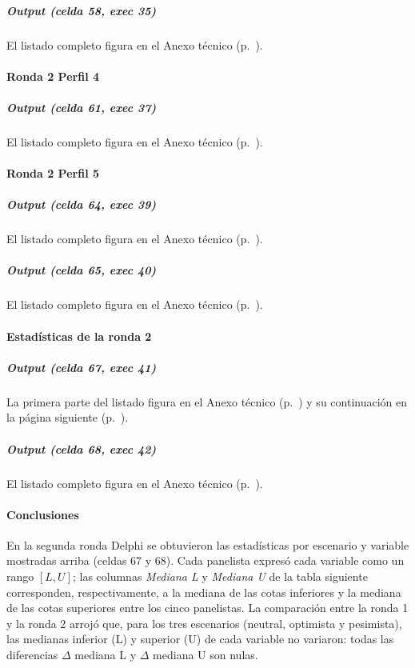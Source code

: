 \subparagraph{Output (celda 58, exec 35)}
El listado completo figura en el Anexo técnico (p.~\pageref{anexo:code-6-3-2-12}).


\paragraph{Ronda 2 Perfil 4}

\subparagraph{Output (celda 61, exec 37)}
El listado completo figura en el Anexo técnico (p.~\pageref{anexo:code-6-3-2-13}).


\paragraph{Ronda 2 Perfil 5}

\subparagraph{Output (celda 64, exec 39)}
El listado completo figura en el Anexo técnico (p.~\pageref{anexo:code-6-3-2-14}).

\subparagraph{Output (celda 65, exec 40)}
El listado completo figura en el Anexo técnico (p.~\pageref{anexo:code-6-3-2-15}).


\paragraph{Estadísticas de la ronda 2}

\subparagraph{Output (celda 67, exec 41)}
La primera parte del listado figura en el Anexo técnico (p.~\pageref{anexo:code-6-3-2-16}) y su continuación en la página siguiente (p.~\pageref{anexo:code-6-3-2-17}).

\subparagraph{Output (celda 68, exec 42)}
El listado completo figura en el Anexo técnico (p.~\pageref{anexo:code-6-3-2-18}).

\paragraph{Conclusiones}

En la segunda ronda Delphi se obtuvieron las estadísticas por escenario y variable mostradas arriba (celdas 67 y 68). Cada panelista expresó cada variable como un rango $[L, U]$; las columnas \emph{Mediana L} y \emph{Mediana U} de la tabla siguiente corresponden, respectivamente, a la mediana de las cotas inferiores y la mediana de las cotas superiores entre los cinco panelistas. La comparación entre la ronda 1 y la ronda 2 arrojó que, para los tres escenarios (neutral, optimista y pesimista), las medianas inferior (L) y superior (U) de cada variable no variaron: todas las diferencias $\Delta$ mediana L y $\Delta$ mediana U son nulas.

